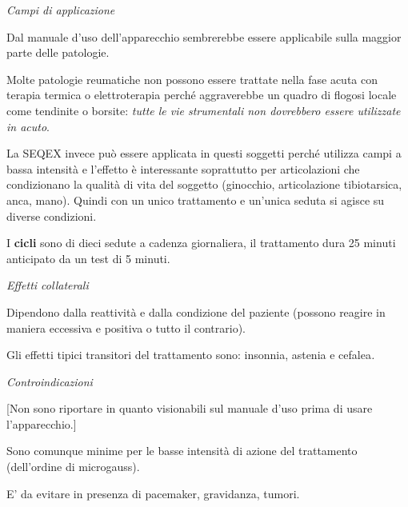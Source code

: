 \documentclass[]{article}
\begin{document}
\emph{Campi di applicazione}

Dal manuale d'uso dell'apparecchio sembrerebbe essere applicabile sulla
maggior parte delle patologie.

Molte patologie reumatiche non possono essere trattate nella fase acuta
con terapia termica o elettroterapia perché aggraverebbe un quadro di
flogosi locale come tendinite o borsite: \emph{tutte le vie strumentali
non dovrebbero essere utilizzate in acuto}.

La SEQEX invece può essere applicata in questi soggetti perché utilizza
campi a bassa intensità e l'effetto è interessante soprattutto per
articolazioni che condizionano la qualità di vita del soggetto
(ginocchio, articolazione tibiotarsica, anca, mano). Quindi con un unico
trattamento e un'unica seduta si agisce su diverse condizioni.

I \textbf{cicli} sono di dieci sedute a cadenza giornaliera, il
trattamento dura 25 minuti anticipato da un test di 5 minuti.

\emph{Effetti collaterali}

Dipendono dalla reattività e dalla condizione del paziente (possono
reagire in maniera eccessiva e positiva o tutto il contrario).

Gli effetti tipici transitori del trattamento sono: insonnia, astenia e
cefalea\emph{.}

\emph{Controindicazioni }

{[}Non sono riportare in quanto visionabili sul manuale d'uso prima di
usare l'apparecchio.{]}

Sono comunque minime per le basse intensità di azione del trattamento
(dell'ordine di microgauss).

E' da evitare in presenza di pacemaker, gravidanza, tumori.
\end{document}
